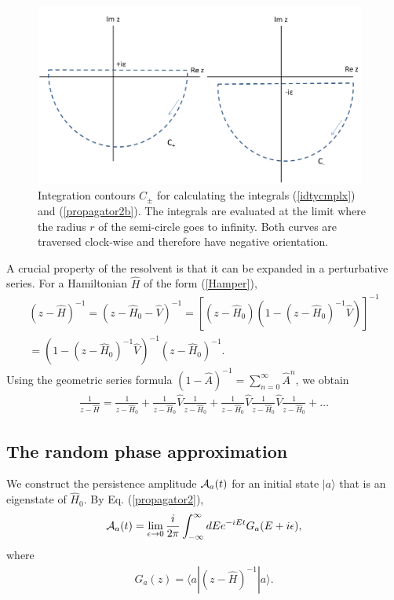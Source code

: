 \documentclass[12pt]{article}
\numberwithin{equation}{section}
\begin{document}
\begin{figure}[]
\includegraphics[height=6cm]{complexcurve} \caption{ \small Integration contours $C_{\pm}$ for calculating the integrals  (\ref{idtycmplx}) and (\ref{propagator2b}).  The integrals are evaluated at the limit where the radius $r$ of the semi-circle goes to infinity. Both curves are traversed clock-wise and therefore have negative orientation.}
\end{figure}


A crucial property of the resolvent is that it can be expanded in a perturbative series. For a Hamiltonian $\hat{H}$ of the form (\ref{Hamper}),
 \begin{eqnarray}
  (z - \hat{H})^{-1}
 = (z - \hat{H}_0 - \hat{V})^{-1} = [(z-\hat{H}_0) (1 - (z-\hat{H}_0)^{-1}\hat{V})]^{-1}\nonumber \\
  = (1 - (z-\hat{H}_0)^{-1}\hat{V})^{-1}(z-\hat{H}_0)^{-1}. \nonumber
 \end{eqnarray}
 Using the geometric series formula $(1 - \hat{A})^{-1} = \sum_{n=0}^{\infty} \hat{A}^n$, we obtain
\begin{eqnarray}
\frac{1}{z - \hat{H}} = \frac{1}{z - \hat{H}_0} + \frac{1}{z - \hat{H}_0}  \hat{V} \frac{1}{z - \hat{H}_0}  + \frac{1}{z - \hat{H}_0}  \hat{V}\frac{1}{z - \hat{H}_0}  \hat{V} \frac{1}{z - \hat{H}_0}  + \ldots \label{seriesprop}
\end{eqnarray}

\subsection{The random phase approximation}
We construct the persistence amplitude  ${\cal A}_a(t)$ for an initial state $|a\rangle$ that is an eigenstate of $\hat{H}_0$. By  Eq. (\ref{propagator2}),
 \begin{eqnarray}
 {\cal A}_a(t) = \lim_{\epsilon \rightarrow 0} \frac{i}{2\pi } \int_{-\infty }^{\infty } dE e^{-iEt}  G_a(E+i\epsilon) , \label{ampll}
 \end{eqnarray}
 where
  \begin{eqnarray}
  G_a(z) =  \langle a|(z - \hat{H})^{-1}|a\rangle.
 \end{eqnarray}
\end{document}
